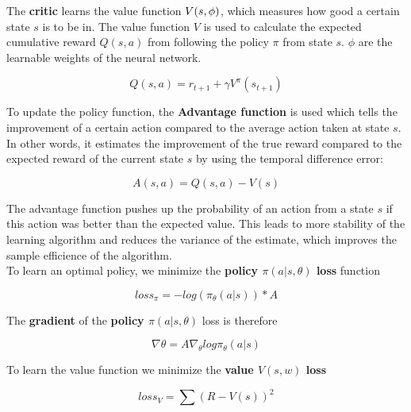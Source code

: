 The \textbf{critic} learns the value function $\mathnormal{V(s, \phi)}$, which measures how good a certain state $s$ is to be in. The value function $V$ is used to calculate the expected cumulative reward $Q(s, a)$ from following the policy $\pi$ from state $s$.
$\phi$ are the learnable weights of the neural network.

\begin{equation}
	Q(s, a) = r_{t+1} + \gamma V^\pi(s_{t+1})
\end{equation}

To update the policy function, the \textbf{Advantage function} is used which tells the improvement of a certain action compared to the average action taken at state $s$. 
In other words, it estimates the improvement of the true reward compared to the expected reward of the current state $s$ by using the temporal difference error:

\begin{equation}
	A(s, a) = Q(s, a) - V(s)
\end{equation}

The advantage function pushes up the probability of an action from a state $s$ if this action was better than the expected value.
This leads to more stability of the learning algorithm and reduces the variance of the estimate, which improves the sample efficience of the algorithm.\\

To learn an optimal policy, we minimize the \textbf{policy $\pi(a | s, \theta)$ loss} function

\begin{equation}
	loss_\pi = - log (\pi_\theta(a | s)) * A
\end{equation}

The \textbf{gradient} of the \textbf{policy $\pi(a | s, \theta)$} loss is therefore

\begin{equation}
	\nabla \theta = A \nabla_\theta log \pi_\theta (a | s)
\end{equation}
	
To learn the value function we minimize the \textbf{value $V(s, w)$ loss}

\begin{equation}
	loss_V = \sum(R - V(s))^2
\end{equation}


